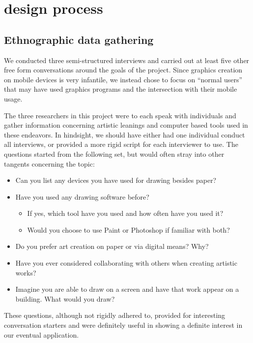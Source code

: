 \documentclass{chi2009}
\begin{document}
\section{design process}

\subsection{Ethnographic data gathering}

We conducted three semi-structured interviews and carried out at least five
other free form conversations around the goals of the project.  Since graphics
creation on mobile devices is very infantile, we instead chose to focus on
``normal users'' that may have used graphics programs and the intersection with
their mobile usage.

The three researchers in this project were to each speak with individuals and
gather information concerning artistic leanings and computer based tools used
in these endeavors.  In hindsight, we should have either had one individual
conduct all interviews, or provided a more rigid script for each interviewer to
use.  The questions started from the following set, but would often stray into
other tangents concerning the topic:

\begin{itemize}
\item Can you list any devices you have used for drawing besides paper?
\item Have you used any drawing software before?
	\begin{itemize}
	\item If yes, which tool have you used and how often have you used it?
	\item Would you choose to use Paint or Photoshop if familiar with both?
	\end{itemize}
\item Do you prefer art creation on paper or via digital means?  Why?
\item Have you ever considered collaborating with others when creating artistic works?
\item Imagine you are able to draw on a screen and have that work appear on a
	building.  What would you draw?
\end{itemize}

These questions, although not rigidly adhered to, provided for interesting
conversation starters and were definitely useful in showing a definite interest
in our eventual application.
\end{document}
